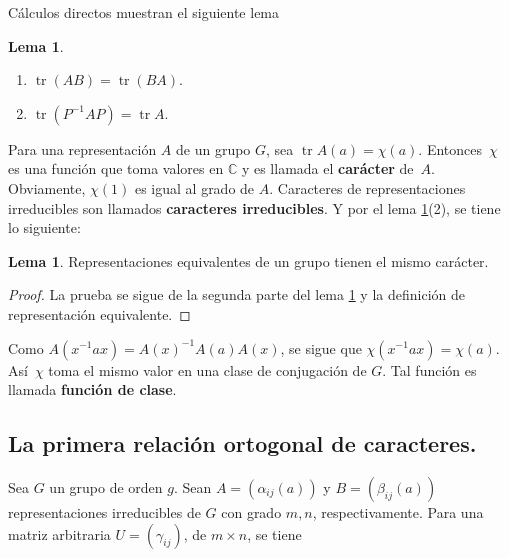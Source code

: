 \documentclass[12pt]{book}
\DeclareMathOperator{\tr}{tr}
\theoremstyle{definition}
\newtheorem{lemma}[theorem]{Lema}
\newcounter{in}
\newcounter{ini}
\begin{document}
Cálculos directos muestran el siguiente lema

\begin{lemma}
   \label{l4_1}
  \begin{enumerate} Para alguna matriz no singular $P$, se sigue que:
  \item $\tr (AB)=\tr (BA) $.
  \item $\tr (P^{-1}AP)=\tr A$.
  \end{enumerate}
\end{lemma}

Para una representación $A$ de un grupo $G$, sea $\tr
A(a)=\chi(a)$. Entonces~$\chi$ es una función que toma valores en
$\mathbb{C}$ y es llamada el \textbf{carácter} de~$A$. Obviamente,
$\chi(1)$ es igual al grado de $A$. Caracteres de representaciones
irreducibles son llamados \textbf{caracteres irreducibles}. Y por el
lema \ref{l4_1}(2), se tiene lo siguiente:

\begin{lemma}
  \label{l4_2}
  Representaciones equivalentes de un grupo tienen el mismo carácter.
\end{lemma}
\begin{proof}
  La prueba se sigue de la segunda parte del lema \ref{l4_1} y la
  definición de representación equivalente.
\end{proof}
Como $A(x^{-1}ax)=A(x)^{-1}A(a)A(x)$, se sigue que
$ \chi(x^{-1}ax)=\chi(a)$. Así~$\chi$ toma el mismo valor en una clase
de conjugación de $G$. Tal función es llamada \textbf{función de clase}.

\subsection{La primera relación ortogonal de caracteres.}
\label{subsec:roc1}
Sea $G$ un grupo de orden $g$. Sean $A=(\alpha_{ij}(a))$ y
$B=(\beta_{ij}(a))$ representaciones irreducibles de $G$ con grado
$m,n$, respectivamente. Para una matriz arbitraria $U=(\gamma_{ij})$,
de $m \times n$, se tiene
\end{document}
